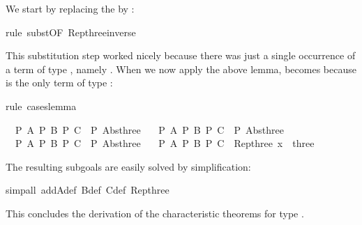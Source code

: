 \begin{isabellebody}
\begin{isamarkuptxt}
\noindent
We start by replacing the  by :%
\end{isamarkuptxt}%
rule\ subst{\isacharbrackleft}OF\ Rep{\isacharunderscore}three{\isacharunderscore}inverse{\isacharbrackright}{\isacharparenright}%
\begin{isamarkuptxt}%
\noindent
This substitution step worked nicely because there was just a single
occurrence of a term of type , namely .
When we now apply the above lemma,  becomes  because  is the only term of type :%
\end{isamarkuptxt}%
rule\ cases{\isacharunderscore}lemma{\isacharparenright}%
\begin{isamarkuptxt}%
\begin{isabelle}%
\ {}{\isachardot}\ {\isasymlbrakk}P\ A{\isacharsemicolon}\ P\ B{\isacharsemicolon}\ P\ C{\isasymrbrakk}\ {\isasymLongrightarrow}\ P\ {\isacharparenleft}Abs{\isacharunderscore}three\ {}{\isacharparenright}\isanewline
\ {}{\isachardot}\ {\isasymlbrakk}P\ A{\isacharsemicolon}\ P\ B{\isacharsemicolon}\ P\ C{\isasymrbrakk}\ {\isasymLongrightarrow}\ P\ {\isacharparenleft}Abs{\isacharunderscore}three\ {}{\isacharparenright}\isanewline
\ {}{\isachardot}\ {\isasymlbrakk}P\ A{\isacharsemicolon}\ P\ B{\isacharsemicolon}\ P\ C{\isasymrbrakk}\ {\isasymLongrightarrow}\ P\ {\isacharparenleft}Abs{\isacharunderscore}three\ {}{\isacharparenright}\isanewline
\ {}{\isachardot}\ {\isasymlbrakk}P\ A{\isacharsemicolon}\ P\ B{\isacharsemicolon}\ P\ C{\isasymrbrakk}\ {\isasymLongrightarrow}\ Rep{\isacharunderscore}three\ x\ {\isasymin}\ three%
\end{isabelle}
The resulting subgoals are easily solved by simplification:%
\end{isamarkuptxt}%
simp{\isacharunderscore}all\ add{\isacharcolon}A{\isacharunderscore}def\ B{\isacharunderscore}def\ C{\isacharunderscore}def\ Rep{\isacharunderscore}three{\isacharparenright}\isanewline
{}%
\begin{isamarkuptext}%
\noindent
This concludes the derivation of the characteristic theorems for
type .


\end{isamarkuptext}
\end{isabellebody}
